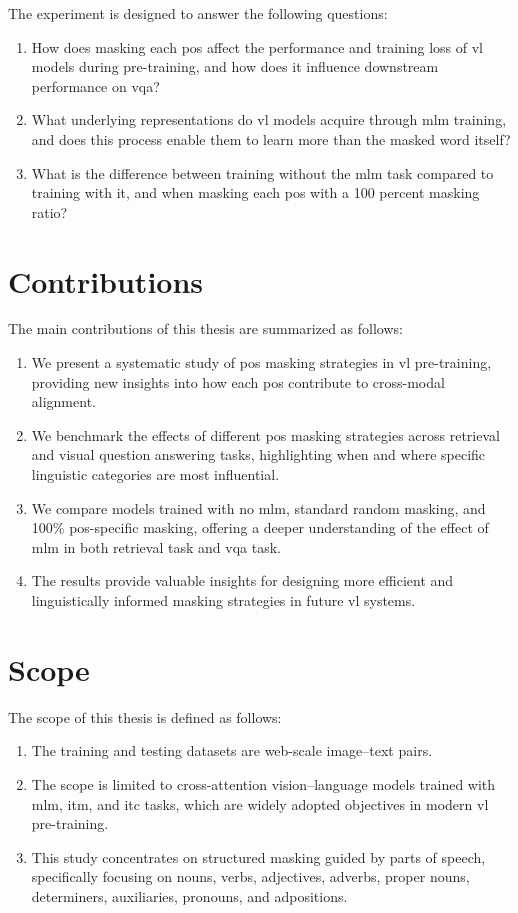 The experiment is designed to answer the following questions:  
\begin{enumerate}  
    \item How does masking each \acrshort{pos} affect the performance and training loss of \acrshort{vl} models during pre-training, and how does it influence downstream performance on \acrfull{vqa}?
    \item What underlying representations do \acrshort{vl} models acquire through \acrshort{mlm} training, and does this process enable them to learn more than the masked word itself?
    \item What is the difference between training without the \acrshort{mlm} task compared to training with it, and when masking each \acrshort{pos} with a 100 percent masking ratio?
\end{enumerate}

\section{Contributions}  
The main contributions of this thesis are summarized as follows:  
\begin{enumerate}  
    \item We present a systematic study of \acrshort{pos} masking strategies in \acrshort{vl} pre-training, providing new insights into how each \acrshort{pos} contribute to cross-modal alignment. 
    \item We benchmark the effects of different \acrshort{pos} masking strategies across retrieval and visual question answering tasks, highlighting when and where specific linguistic categories are most influential. 
    \item We compare models trained with no \acrshort{mlm}, standard random masking, and 100\% \acrshort{pos}-specific masking, offering a deeper understanding of the effect of \Acrshort{mlm} in both retrieval task and \acrshort{vqa} task. 
    \item The results provide valuable insights for designing more efficient and linguistically informed masking strategies in future \acrshort{vl} systems.
\end{enumerate}  

\section{Scope}  
The scope of this thesis is defined as follows:  
\begin{enumerate}  
    \item The training and testing datasets are web-scale image–text pairs.  
    \item The scope is limited to cross-attention vision–language models trained with \acrshort{mlm}, \acrshort{itm}, and \acrshort{itc} tasks, which are widely adopted objectives in modern \acrshort{vl} pre-training.
    \item This study concentrates on structured masking guided by parts of speech, specifically focusing on nouns, verbs, adjectives, adverbs, proper nouns, determiners, auxiliaries, pronouns, and adpositions.
\end{enumerate}  